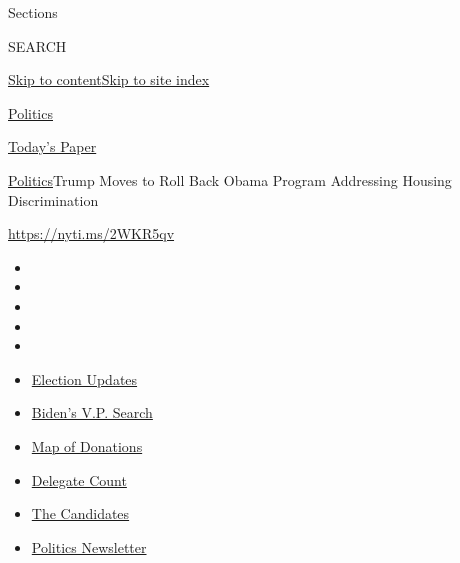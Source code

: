 Sections

SEARCH

\protect\hyperlink{site-content}{Skip to
content}\protect\hyperlink{site-index}{Skip to site index}

\href{https://www.nytimes.com/section/politics}{Politics}

\href{https://myaccount.nytimes.com/auth/login?response_type=cookie\&client_id=vi}{}

\href{https://www.nytimes.com/section/todayspaper}{Today's Paper}

\href{/section/politics}{Politics}\textbar{}Trump Moves to Roll Back
Obama Program Addressing Housing Discrimination

\url{https://nyti.ms/2WKR5qv}

\begin{itemize}
\item
\item
\item
\item
\item
\end{itemize}

\begin{itemize}
\item
  \href{https://www.nytimes.com/2020/07/31/us/elections/biden-vs-trump.html?action=click\&pgtype=Article\&state=default\&region=TOP_BANNER\&context=storylines_menu}{Election
  Updates}
\item
  \href{https://www.nytimes.com/article/biden-vice-president-2020.html?action=click\&pgtype=Article\&state=default\&region=TOP_BANNER\&context=storylines_menu}{Biden's
  V.P. Search}
\item
  \href{https://www.nytimes.com/interactive/2020/07/24/us/politics/trump-biden-campaign-donors.html?action=click\&pgtype=Article\&state=default\&region=TOP_BANNER\&context=storylines_menu}{Map
  of Donations}
\item
  \href{https://www.nytimes.com/interactive/2020/us/elections/delegate-count-primary-results.html?action=click\&pgtype=Article\&state=default\&region=TOP_BANNER\&context=storylines_menu}{Delegate
  Count}
\item
  \href{https://www.nytimes.com/interactive/2019/us/politics/2020-presidential-candidates.html?action=click\&pgtype=Article\&state=default\&region=TOP_BANNER\&context=storylines_menu}{The
  Candidates}
\item
  \href{https://www.nytimes.com/newsletters/politics?action=click\&pgtype=Article\&state=default\&region=TOP_BANNER\&context=storylines_menu}{Politics
  Newsletter}
\end{itemize}

